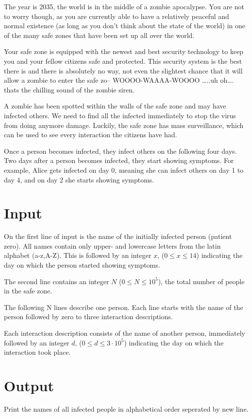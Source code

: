 
The year is 2035, the world is in the middle of a zombie apocalypse. You are not to worry though, as you are currently able to have a relatively peaceful and normal existence (as long as you don’t think about the state of the world) in one of the many safe zones that have been set up all over the world. 

Your safe zone is equipped with the newest and best security technology to keep you and your fellow citizens safe and protected. This security system is the best there is and there is absolutely no way, not even the slightest chance that it will allow a zombie to enter the safe zo– WOOOO-WAAAA-WOOOO …..uh oh…. thats the chilling sound of the zombie siren. 

A zombie has been spotted within the walls of the safe zone and may have infected others. We need to find all the infected immediately to stop the virus from doing anymore damage. Luckily, the safe zone has mass surveillance, which can be used to see every interaction the citizens have had. 

Once a person becomes infected, they infect others on the following four days. Two days after a person becomes infected, they start showing symptoms. For example, Alice gets infected on day 0, meaning she can infect others on day 1 to day 4, and on day 2 she starts showing symptoms.

\section*{Input}
On the first line of input is the name of the initially infected person (patient zero). All names contain only upper- and lowercase letters from the latin alphabet (a-z,A-Z). This is followed by an integer $x$, ($0 \le x \le 14$) indicating the day on which the person started showing symptoms. 

The second line contains an integer $N$ ($0 \le N \le 10^5$), the total number of people in the safe zone.

The following N lines describe one person. Each line starts with the name of the person followed by zero to three interaction descriptions.

Each interaction description consists of the name of another person, immediately followed by an integer $d$, ($0 \le d \le 3 \cdot 10^5$) indicating the day on which the interaction took place. 

\section*{Output}
Print the names of all infected people in alphabetical order seperated by new line.
